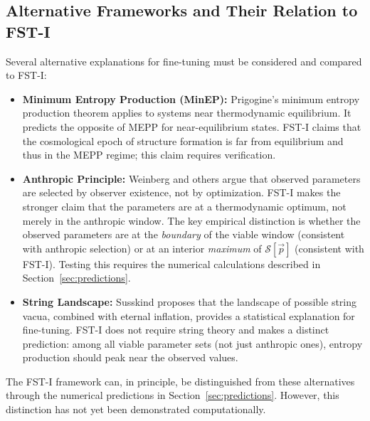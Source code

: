 \documentclass[12pt,a4paper]{article}
\theoremstyle{remark}
\begin{document}
\subsection{Alternative Frameworks and Their Relation to FST-I}

Several alternative explanations for fine-tuning must be considered and compared to FST-I:

\begin{itemize}
    \item \textbf{Minimum Entropy Production (MinEP):} Prigogine's minimum entropy production theorem applies to systems near thermodynamic equilibrium. It predicts the opposite of MEPP for near-equilibrium states. FST-I claims that the cosmological epoch of structure formation is far from equilibrium and thus in the MEPP regime; this claim requires verification.
    \item \textbf{Anthropic Principle:} Weinberg \citep{Weinberg1987} and others argue that observed parameters are selected by observer existence, not by optimization. FST-I makes the stronger claim that the parameters are at a thermodynamic optimum, not merely in the anthropic window. The key empirical distinction is whether the observed parameters are at the \emph{boundary} of the viable window (consistent with anthropic selection) or at an interior \emph{maximum} of $\mathcal{S}[\vec{p}]$ (consistent with FST-I). Testing this requires the numerical calculations described in Section~\ref{sec:predictions}.
    \item \textbf{String Landscape:} Susskind \citep{Susskind2005} proposes that the landscape of possible string vacua, combined with eternal inflation, provides a statistical explanation for fine-tuning. FST-I does not require string theory and makes a distinct prediction: among all viable parameter sets (not just anthropic ones), entropy production should peak near the observed values.
\end{itemize}

The FST-I framework can, in principle, be distinguished from these alternatives through the numerical predictions in Section~\ref{sec:predictions}. However, this distinction has not yet been demonstrated computationally.
\end{document}
